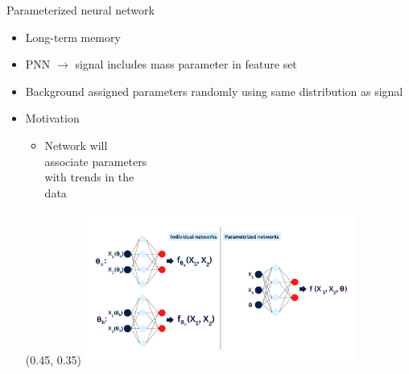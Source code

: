 \documentclass[UKenglish]{beamer}
\begin{document}
\begin{frame}{Parameterized neural network}
    \begin{itemize}
        \item Long-term memory
        \item PNN $\rightarrow$ signal includes mass parameter in feature set
        \item Background assigned
        parameters randomly
        using same distribution
        as signal
        \item Motivation
        \begin{itemize}
            \item Network will \\
            associate parameters\\
            with trends in the \\
            data
        \end{itemize}
        \begin{textblock}{0.8}(0.45, 0.35)
            \includegraphics[width = 0.7\textwidth]{figures/PNN.png}
        \end{textblock}
    \end{itemize}
\end{frame}
\end{document}
